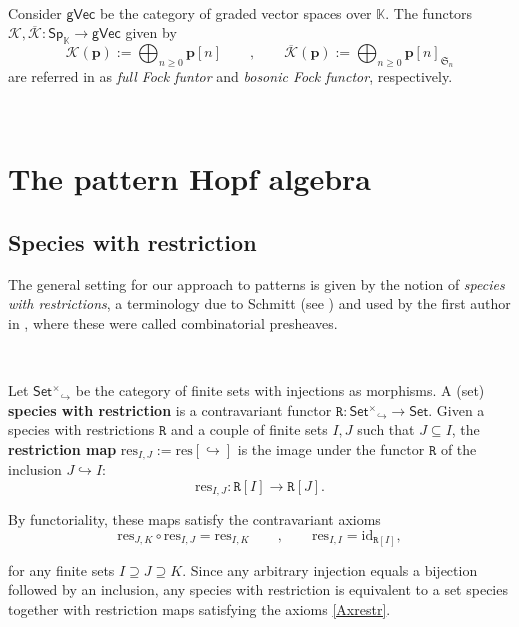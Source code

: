 \documentclass[12pt, reqno]{amsart}
\theoremstyle{definition}
\newcommand{\Fset}{\mathsf{Set^{\times}}}
\newcommand{\gVec}{\mathsf{gVec}}
\newcommand{\Set}{\mathsf{Set}}
\newcommand{\Ssk}{\mathsf{Sp}_\Kb} %
\newcommand{\Kb}{\mathbb{K}}
\newcommand{\prR}{\mathtt{R}}
\newcommand{\tp}{\mathbf{p}}
\newcommand{\Kc}{\mathcal{K}}
\newcommand{\Kcb}{\overline{\Kc}}
\begin{document}
\


Consider $\gVec$ be the category of graded vector spaces over $\mathbb{K}$. The functors $\Kc, \Kcb: \Ssk \to \gVec$ given by 
\begin{equation}
    \Kc(\tp):=\bigoplus_{n \geq 0}\tp[n] \qquad , \qquad \Kcb(\tp):= \bigoplus_{n \geq 0}\tp[n]_{\mathfrak{S}_n}
\end{equation}
are referred in \cite{AM2010} as \emph{full Fock funtor} and \emph{bosonic Fock functor}, respectively.

\

\section{The pattern Hopf algebra \label{sec:pattern_algebra_contruction}}

\subsection{Species with restriction}
The general setting for our approach to patterns is given by the notion of \emph{species with restrictions}, a terminology due to Schmitt (see \cite{Schmitt1993}) and used by the first author in \cite{Penaguiao2020}, where these were called combinatorial presheaves.

\

Let $\Fset_{\!\!\!\!\!\hookrightarrow}$ be the category of finite sets with injections as morphisms. A (set) {\bf species with restriction} is a contravariant functor $\prR:\Fset_{\!\!\!\!\!\hookrightarrow} \to \Set$. Given a species with restrictions $\prR$ and a couple of finite sets $I,J$ such that $J \subseteq I$, the {\bf restriction map} $\text{res}_{I,J}:=\text{res}[\hookrightarrow]$ is the image under the functor $\prR$ of the inclusion $J \hookrightarrow I$:
\[\text{res}_{I,J}: \prR[I]\to \prR[J].\]

By functoriality, these maps satisfy the contravariant axioms
\begin{equation}\label{Axrestr}
    \text{res}_{J,K}\circ\text{res}_{I,J}=\text{res}_{I,K} \qquad , \qquad \text{res}_{I,I}=\text{id}_{\prR[I]},
\end{equation}

for any finite sets $I \supseteq J \supseteq K$. 
Since any arbitrary injection equals a bijection followed by an inclusion, any species with restriction is equivalent to a set species together with restriction maps satisfying the axioms \eqref{Axrestr}.
\end{document}
